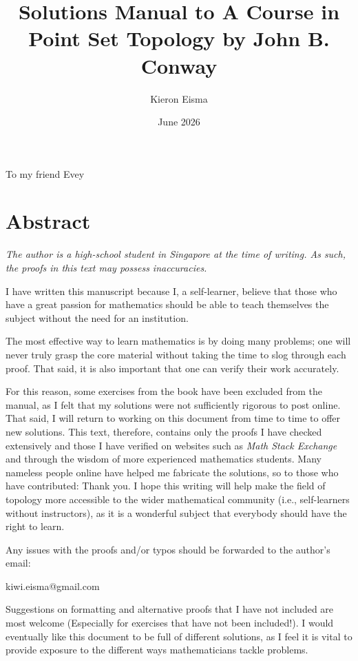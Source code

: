 \documentclass{article}
\title{Solutions Manual to A Course in Point Set Topology by John B. Conway}
\author{Kieron Eisma}
\date{June 2026}
\newenvironment{dedication}
{
  \clearpage
  \thispagestyle{empty}   
  \vspace*{\stretch{1}}     
  \itshape                  
  \centering                
}
{
  \par
  \vspace{\stretch{3}}      
  \clearpage
}
\begin{document}
\maketitle

\begin{dedication}
    To my friend Evey
\end{dedication}




\section*{Abstract}

\textit{The author is a high-school student in Singapore at the time of writing. As such, the proofs in this text may possess inaccuracies.}

I have written this manuscript because I, a self-learner, believe that those who have a great passion for mathematics should be able to teach themselves the subject without the need for an institution. 

The most effective way to learn mathematics is by doing many problems; one will never truly grasp the core material without taking the time to slog through each proof. That said, it is also important that one can verify their work accurately.

For this reason, some exercises from the book have been excluded from the manual, as I felt that my solutions were not sufficiently rigorous to post online. That said, I will return to working on this document from time to time to offer new solutions. This text, therefore, contains only the proofs I have checked extensively and those I have verified on websites such as \textit{Math Stack Exchange} and through the wisdom of more experienced mathematics students. Many nameless people online have helped me fabricate the solutions, so to those who have contributed:
Thank you. I hope this writing will help make the field of topology more accessible to the wider mathematical community (i.e., self-learners without instructors), as it is a wonderful subject that everybody should have the right to learn.

Any issues with the proofs and/or typos should be forwarded to the author's email:

kiwi.eisma@gmail.com

Suggestions on formatting and alternative proofs that I have not included are most welcome (Especially for exercises that have not been included!). I would eventually like this document to be full of different solutions, as I feel it is vital to provide exposure to the different ways mathematicians tackle problems.
\end{document}
